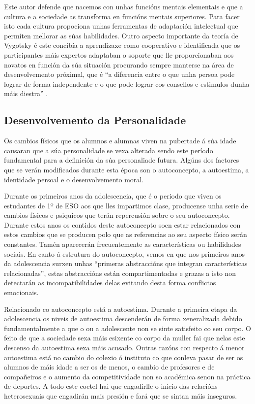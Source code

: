 Este autor defende que nacemos con unhas funcións mentais elementais e que a cultura e a sociedade as transforma en funcións mentais superiores. Para facer isto cada cultura propociona unhas ferramentas de adaptación intelectual que permíten mellorar as súas habilidades. Outro aspecto importante da teoría de Vygotsky é este concibía a aprendizaxe como cooperativo e identificada que os participantes máis expertos adaptaban o soporte que lle proporcionaban aos novatos en función da súa situación procurando sempre manterse na área de desenvolvemento próximal, que é ``a diferencia entre o que unha persoa pode lograr de forma independente e o que pode lograr cos consellos e estimulos dunha máis diestra'' \cite[p.~278]{shaffer2000psicologia}.

\subsection{Desenvolvemento da Personalidade}
Os cambios físicos que os alumnos e alumnas viven na pubertade á súa idade causaran que a súa personalidade se vexa alterada sendo este período fundamental para a definición da súa personaliade futura. Algúns dos factores que se verán modificados durante esta época son o autoconcepto, a autoestima, a identidade persoal e o desenvolvemento moral.

Durante os primeiros anos da adolescencia, que é o periodo que viven os estudantes de 1º de ESO aos que lles impartimos clase, producense unha serie de cambios físicos e psiquicos que terán repercusión sobre o seu autoconcepto. Durante estos anos os contidos deste autoconcepto soen estar relacionados con estos cambios que se producen polo que as referencias ao seu aspecto físico serán constantes. Tamén aparecerán frecuentemente as características ou habilidades sociais. En canto á estrutura do autoconcepto, vemos en \cite[p.~473]{coll1990desarrollo} que nos primeiros anos da adolescencia surxen unhas ``primeras abstraccións que integran características relacionadas'', estas abstraccións están compartimentadas e grazas a isto non detectarán as incompatibilidades delas evitando desta forma conflictos emocionais.

Relacionado co autoconcepto está a autoestima. Durante a primeira etapa da adolescencia os niveis de autoestima descenderán de forma xeneralizada debido fundamentalmente a que o ou a adolescente non se sinte satisfeito co seu corpo. O feito de que a sociedade sexa máis esixente co corpo da muller fai que nelas este descenso da autoestima sexa máis acusado. Outras razóns con respecto á menor autoestima está no cambio do colexio ó instituto co que conleva pasar de ser os alumnos de máis idade a ser os de menos, o cambio de profesores e de compañeiros e o aumento da competitividade non so académica senon na práctica de deportes. A todo este coctel hai que engadirlle o inicio das relacións heterosexuais que engadirán mais presión e fará que se sintan máis inseguros.

